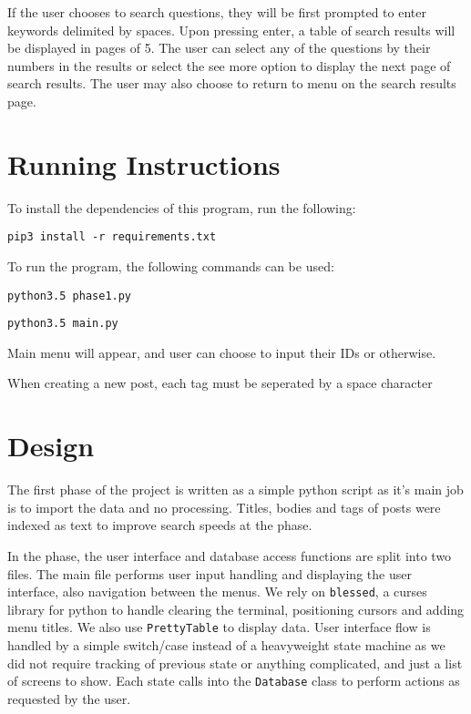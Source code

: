 \documentclass{article}
\begin{document}
If the user chooses to search questions, they will be first prompted to enter keywords delimited by spaces. Upon pressing enter, a table of search results will be displayed in pages of 5. The user can select any of the questions by their numbers in the results or select the see more option to display the next page of search results. The user may also choose to return to menu on the search results page.

\section{Running Instructions}

To install the dependencies of this program, run the following:

\verb|pip3 install -r requirements.txt|

To run the program, the following commands can be used:

\verb|python3.5 phase1.py|

\verb|python3.5 main.py|


Main menu will appear, and user can choose to input their IDs or otherwise.

When creating a new post, each tag must be seperated by a space character

\section{Design}

The first phase of the project is written as a simple python script as it's main job is to import the data and no processing. Titles, bodies and tags of posts were indexed as text to improve search speeds at the  phase.

In the  phase, the user interface and database access functions are split into two files. The main file performs user input handling and displaying the user interface, also navigation between the menus. We rely on \verb|blessed|, a curses library for python to handle clearing the terminal, positioning cursors and adding menu titles. We also use \verb|PrettyTable| to display data. User interface flow is handled by a simple switch/case instead of a heavyweight state machine as we did not require tracking of previous state or anything complicated, and just a list of screens to show. Each state calls into the \verb|Database| class to perform actions as requested by the user.
\end{document}
